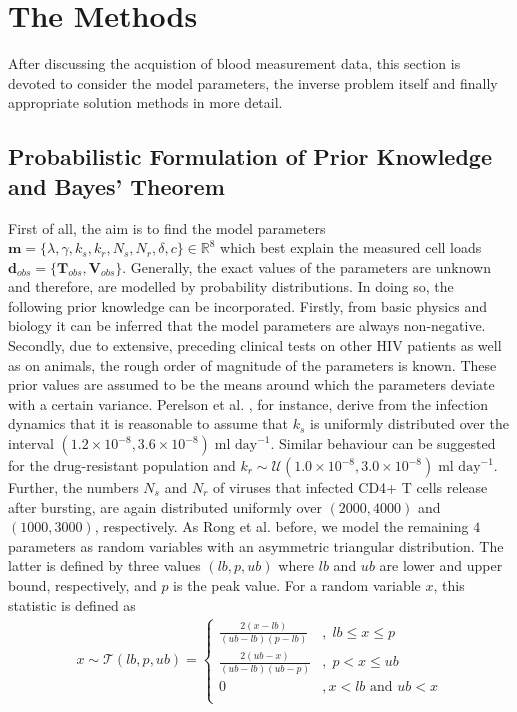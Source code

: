 \section{The Methods}
\label{sec:methods}

After discussing the acquistion of blood measurement data, this section is devoted to consider the model parameters, the inverse problem itself and finally appropriate solution methods in more detail.

\subsection{Probabilistic Formulation of Prior Knowledge and Bayes' Theorem}

First of all, the aim is to find the model parameters $\mathbf{m} = \{\lambda, \gamma, k_s, k_r, N_s, N_r, \delta, c\} \in \mathbb{R}^8$ which best explain the measured cell loads $\mathbf{d}_{obs} = \{\mathbf{T}_{obs},\mathbf{V}_{obs}\}$.
Generally, the exact values of the parameters are unknown and therefore, are modelled by probability distributions.
In doing so, the following prior knowledge can be incorporated.
Firstly, from basic physics and biology it can be inferred that the model parameters are always non-negative.
Secondly, due to extensive, preceding clinical tests on other HIV patients as well as on animals, the rough order of magnitude of the parameters is known.
These prior values are assumed to be the means around which the parameters deviate with a certain variance.
Perelson et al. \cite{perelson1993}, for instance, derive from the infection dynamics that it is reasonable to assume that $k_s$ is uniformly distributed over the interval $(1.2\times 10^{-8}, 3.6\times 10^{-8})\;\text{ml day}^{-1}$.
Similar behaviour can be suggested for the drug-resistant population and $k_r \sim \mathcal{U}(1.0\times 10^{-8}, 3.0\times 10^{-8})\;\text{ml day}^{-1}$. 
Further, the numbers $N_s$ and $N_r$ of viruses that infected CD4+ T cells release after bursting, are again distributed uniformly over $(2000,4000)$ and $(1000,3000)$, respectively.\newline
As Rong et al. \cite{rong2007emergence} before, we model the remaining $4$ parameters as random variables with an asymmetric triangular distribution.
The latter is defined by three values $(lb,p,ub)$ where $lb$ and $ub$ are lower and upper bound, respectively, and $p$ is the peak value.
For a random variable $x$, this statistic is defined as
\begin{align}
    x \sim \mathcal{T}(lb,p,ub) = 
    \begin{cases}
        \frac{2(x-lb)}{(ub-lb)(p-lb)}&,\; lb \leq x \leq p\\ 
        \frac{2(ub-x)}{(ub-lb)(ub-p)}&,\; p < x \leq ub\\
        0 \;&, x < lb \text{ and } ub < x\\
    \end{cases}
    \label{equ:asy_tri_distribution}
\end{align}
